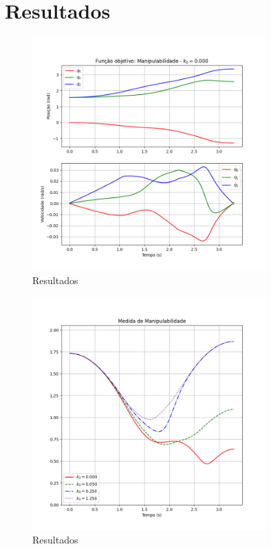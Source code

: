 \chapter{Resultados}\label{cap:results}

\begin{figure}
    \centering
    \includegraphics[width=0.8\textwidth]{Images/manipulability/k0=0_00.png}
    \caption{Resultados}\label{fig:man-k0-0_00}
\end{figure}

\begin{figure}
    \centering
    \includegraphics[width=0.8\textwidth]{Images/manipulability/manipulability_measure.png}
    \caption{Resultados}\label{fig:man}
\end{figure}

